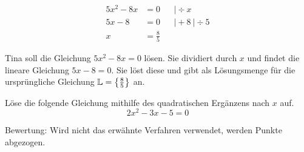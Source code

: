 \documentclass[11pt]{exam}
\begin{document}
\begin{questions}


\noaddpoints
\question[\totalpoints]  %
\addpoints
\begin{align*}
	5x^2-8x&=0 && \vert\div x\\
	5x-8&=0 &&\vert+8\:\vert\div 5\\
	x&=\frac{8}{5}
\end{align*}

\noaddpoints
\question[\totalpoints] %
\addpoints
Tina soll die Gleichung $5x^2-8x=0$ lösen. Sie dividiert durch $x$ und findet die lineare Gleichung $5x-8=0$. Sie löst diese und gibt als Lösungsmenge für die ursprüngliche Gleichung  $\mathbb{L}=\left\{\frac{8}{5}\right\}$ an.

\question[4]
Löse die folgende Gleichung mithilfe des quadratischen Ergänzens nach $x$ auf. \[2x^2-3x-5=0\]
\begin{small}
    Bewertung: Wird nicht das erwähnte Verfahren verwendet, werden Punkte abgezogen.
\end{small}


\end{questions}
\end{document}
